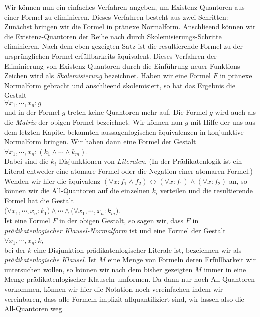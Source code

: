 Wir k\"{o}nnen nun ein einfaches Verfahren angeben, um Existenz-Quantoren aus einer Formel
zu eliminieren.  Dieses Verfahren besteht aus zwei Schritten:  Zun\"{a}chst bringen wir die Formel
in pr\"{a}nexe Normalform. Anschlie\3end k\"{o}nnen wir die Existenz-Quantoren der Reihe nach durch 
Skolemisierungs-Schritte eliminieren.  Nach dem eben gezeigten Satz ist die resultierende 
Formel zu der urspr\"{u}nglichen Formel erf\"{u}llbarkeits-\"{a}quivalent.  Dieses
Verfahren der Eliminierung von Existenz-Quantoren durch die Einf\"{u}hrung neuer
Funktions-Zeichen wird als \emph{Skolemisierung} bezeichnet.  Haben wir eine Formel $F$
in pr\"{a}nexe Normalform gebracht und anschlie\3end skolemisiert, so hat das Ergebnis die Gestalt\\[0.2cm]
\hspace*{1.3cm} $\forall x_1, \cdots, x_n: g$ \\[0.2cm]
und in der Formel $g$ treten keine Quantoren mehr auf.  Die Formel $g$ wird auch als die
\emph{Matrix} der obigen Formel bezeichnet.  Wir k\"{o}nnen nun  $g$ mit Hilfe
der uns aus dem letzten Kapitel bekannten aussagenlogischen
 \"{a}quivalenzen in konjunktive Normalform bringen.  Wir haben dann eine
Formel der Gestalt \\[0.2cm]
\hspace*{1.3cm} $\forall x_1, \cdots, x_n: (k_1 \wedge \cdots \wedge k_m)$. \\[0.2cm]
Dabei sind die $k_i$ Disjunktionen von \emph{Literalen}.  (In der Pr\"{a}dikatenlogik ist ein
Literal entweder eine atomare Formel oder die Negation einer atomaren Formel.)  Wenden wir
hier  die \"{a}quivalenz 
$(\forall x\colon f_1\wedge f_2) \leftrightarrow (\forall x\colon f_1) \wedge (\forall x\colon f_2)$
an, so k\"{o}nnen wir die All-Quantoren auf die einzelnen $k_i$ verteilen und
die resultierende Formel hat die Gestalt \\[0.2cm]
\hspace*{1.3cm} 
$\big(\forall x_1, \cdots, x_n: k_1\big) \wedge \cdots \wedge \big(\forall x_1, \cdots, x_n: k_m\big)$. \\[0.2cm]
Ist eine Formel $F$ in der obigen
Gestalt, so sagen wir, dass $F$ in {\em pr\"{a}dikatenlogischer Klausel-Normalform} ist und eine
Formel der Gestalt \\[0.2cm]
\hspace*{1.3cm} $\forall x_1, \cdots, x_n: k$, \\[0.2cm]
bei der $k$ eine Disjunktion pr\"{a}dikatenlogischer Literale ist,
bezeichnen wir als \emph{pr\"{a}dikatenlogische Klausel}.  Ist $M$
eine Menge von Formeln deren Erf\"{u}llbarkeit wir untersuchen wollen, so k\"{o}nnen wir nach dem
bisher gezeigten $M$ immer in eine Menge pr\"{a}dikatenlogischer Klauseln umformen.
Da  dann nur noch All-Quantoren vorkommen, k\"{o}nnen wir hier die  Notation noch vereinfachen
indem wir vereinbaren, dass alle Formeln implizit allquantifiziert sind, wir lassen also
die All-Quantoren weg.

